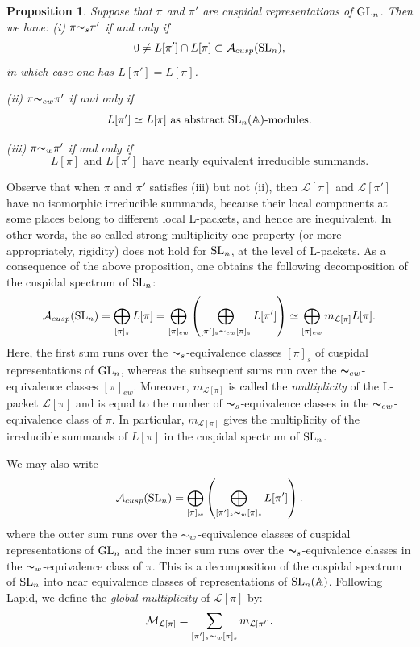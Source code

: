 \documentclass[11pt]{amsart}
\theoremstyle{plain}
\newtheorem{prop}[equation]{Proposition}
\numberwithin{equation}{section}
\newcommand{\A}{\mathbb A}
\def\SL{{\rm SL}}
\def\GL{{\rm GL}}
\def\A{{\mathbb A}}
\begin{document}
\begin{prop}
Suppose that $\pi$ and $\pi'$ are cuspidal representations of $\GL_n$. Then we have:
\vskip 5pt
\noindent (i) $\pi {\thicksim}_s \pi' $ if and only if 
\[  0 \ne L[\pi'] \cap  L[ \pi]   \subset \mathcal{A}_{cusp}(\SL_n), \]
 in which case one has $L[\pi'] = L[\pi] $.    
 
 \vskip 5pt
 
 \noindent (ii)  $\pi {\thicksim}_{ew} \pi'$ if and only if
 \[  \text{$L[ \pi'] \simeq L[\pi] $ as abstract $\SL_n(\A)$-modules.} \]
  

 \vskip 5pt
 
 \noindent (iii) $\pi {\thicksim}_{w} \pi'$ if and only if 
 \[ \text{$L[\pi]$ and $L[\pi']$ have  nearly equivalent irreducible summands.} \]
   \end{prop}
 Observe that when $\pi$ and $\pi'$ satisfies (iii) but not (ii),  then $\mathcal{L}[\pi]$ and $\mathcal{L}[\pi']$ have no isomorphic irreducible summands, because their local components at some places  belong to different local L-packets, and hence are inequivalent. 
 In other words, the so-called strong multiplicity one property (or more appropriately, rigidity) does not hold for $\SL_n$, at the level of L-packets.
\vskip 5pt
As a consequence of the above proposition, one obtains the following decomposition of the cuspidal spectrum of $\SL_n$:
 \[
 \mathcal{A}_{cusp}(\SL_n) = \bigoplus_{ [\pi]_s}  L[\pi]    =   \bigoplus_{[\pi]_{ew}} \left(  \bigoplus_{[\pi']_s {\thicksim}_{ew} [\pi]_s}   L[\pi'] \right)  \simeq   \bigoplus_{[\pi]_{ew}} m_{\mathcal{L}[\pi]} L[\pi]. 
  \]
 Here, the first sum runs over the ${\thicksim}_s$-equivalence classes $[\pi]_s$ of cuspidal representations of $\GL_n$, whereas the subsequent sums run over the ${\thicksim}_{ew}$-equivalence classes $[\pi]_{ew}$. Moreover,  $m_{\mathcal{L}[\pi]}$ is called the {\it multiplicity} of the L-packet $\mathcal{L}[\pi]$ and is equal to  the number of ${\thicksim}_s$-equivalence classes in the ${\thicksim}_{ew}$-equivalence class of $\pi$. In particular, $m_{\mathcal{L}[\pi]}$ gives the multiplicity of the irreducible summands of $L[\pi]$ in the cuspidal spectrum of $\SL_n$. 
 \vskip 5pt
 
 We may  also write
 \[  \mathcal{A}_{cusp}(\SL_n)
   = \bigoplus_{[\pi]_w}\left(  \bigoplus_{ [\pi']_s {\thicksim}_w [\pi]_s}  L[\pi'] \right). \]
where the outer sum runs over the ${\thicksim}_w$-equivalence classes of cuspidal representations of $\GL_n$ and the inner sum runs over the ${\thicksim}_s$-equivalence classes in the ${\thicksim}_w$-equivalence class of $\pi$. This is a decomposition of the cuspidal spectrum of $\SL_n$ into near equivalence classes of representations of $\SL_n(\A)$. Following Lapid, we define the {\it global multiplicity} of $\mathcal{L}[\pi]$ by:
\begin{equation} \label{E:globalmult}
 \mathcal{M}_{\mathcal{L}[\pi]} = \sum_{ [\pi']_s {\thicksim}_w [\pi]_s}  m_{\mathcal{L}[\pi']}. \end{equation}
\end{document}
